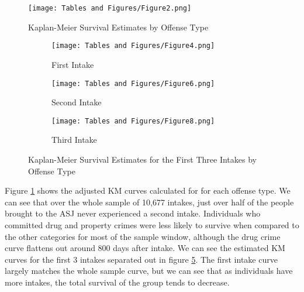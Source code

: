 \documentclass{article}
\begin{document}
\begin{figure}[h]
    \centering
    \texttt{[image: Tables and Figures/Figure2.png]}
    \caption{Kaplan-Meier Survival Estimates by Offense Type}
    \label{fig2}
\end{figure}

\begin{figure}[h!]
     \centering
     \begin{subfigure}[h]{0.45\textwidth}
         \centering
         \texttt{[image: Tables and Figures/Figure4.png]}
         \caption{First Intake}
         \label{fig3a}
     \end{subfigure}
     \hfill
     \begin{subfigure}[h]{0.45\textwidth}
         \centering
         \texttt{[image: Tables and Figures/Figure6.png]}
         \caption{Second Intake}
         \label{fig3b}
     \end{subfigure}
     \hfill
     \begin{subfigure}[h]{0.45\textwidth}
         \centering
         \texttt{[image: Tables and Figures/Figure8.png]}
         \caption{Third Intake}
         \label{fig3c}
     \end{subfigure}
        \caption{Kaplan-Meier Survival Estimates for the First Three Intakes by Offense Type}
        \label{fig3}
\end{figure}
Figure \ref{fig2} shows the adjusted KM curves calculated for for each offense type. We can see that over the whole sample of 10,677 intakes, just over half of the people brought to the ASJ never experienced a second intake. Individuals who committed drug and property crimes were less likely to survive when compared to the other categories for most of the sample window, although the drug crime curve flattens out around 800 days after intake. We can see the estimated KM curves for the first 3 intakes separated out in figure \ref{fig3}. The first intake curve largely matches the whole sample curve, but we can see that as individuals have more intakes, the total survival of the group tends to decrease. 
\end{document}
